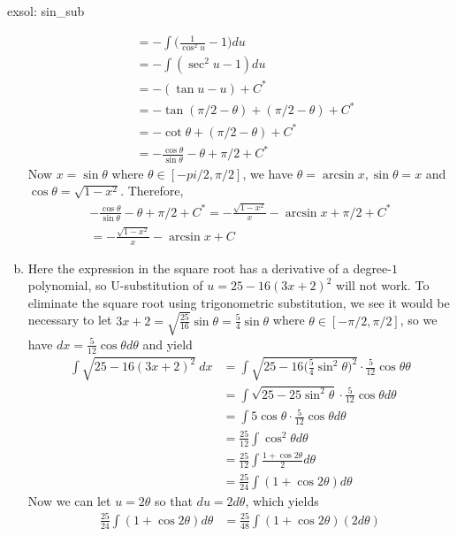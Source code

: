 \begin{exsol}[]{exsol: sin_sub}
\begin{enumerate}[a)]
\begin{align*}
            &= -\int \Big(\frac{1}{\cos^2u} - 1\Big) du\\
            &= -\int (\sec^2 u - 1) du\\
            &= -(\tan u - u) + C^*\\
            &= - \tan (\pi/2 - \theta) + (\pi/2 - \theta) + C^*\\
            &= - \cot \theta + (\pi/2 - \theta) + C^*\\
            &= - \frac{\cos \theta}{\sin \theta} - \theta + \pi/2 + C^*
        \end{align*}
        Now $x = \sin \theta$ where $\theta \in [-pi/2, \pi/2]$, we have $\theta = \arcsin x, \sin \theta = x$ and $\cos \theta = \sqrt{1-x^2}$.  Therefore,
        \begin{align*}
            - \frac{\cos \theta}{\sin \theta} - \theta + \pi/2 + C^* = - \frac{\sqrt{1-x^2}}{x} - \arcsin x + \pi/2 + C^*\\
            = - \frac{\sqrt{1-x^2}}{x} - \arcsin x + C
        \end{align*}
        \item Here the expression in the square root has a derivative of a degree-$1$ polynomial, so U-substitution of $u = 25-16(3x+2)^2$ will not work.  To eliminate the square root using trigonometric substitution, we see it would be necessary to let $3x+2 = \sqrt{\frac{25}{16}}\sin\theta = \frac{5}{4}\sin\theta$ where $\theta \in [-\pi/2, \pi/2]$, so we have $dx = \frac{5}{12}\cos\theta d\theta$ and yield
        \begin{align*}
            \int \sqrt{25-16(3x+2)^2}~dx &= \int \sqrt{25-16\Big(\frac{5}{4}\sin^2\theta\Big)^2}\cdot\frac{5}{12}\cos\theta \theta\\
            &= \int \sqrt{25-25\sin^2\theta}\cdot\frac{5}{12}\cos\theta d\theta\\
            &= \int 5\cos\theta\cdot\frac{5}{12}\cos\theta d\theta\\
            &= \frac{25}{12}\int \cos^2\theta d\theta\\
            &= \frac{25}{12}\int \frac{1+\cos 2\theta}{2} d\theta\\
            &= \frac{25}{24}\int (1+\cos 2\theta) d\theta
        \end{align*}
        Now we can let $u = 2\theta$ so that $du = 2d\theta$, which yields
        \begin{align*}
            \frac{25}{24}\int (1+\cos 2\theta) d\theta &= \frac{25}{48}\int (1+\cos 2\theta) (2d\theta)\\

\end{align*}
\end{enumerate}
\end{exsol}
